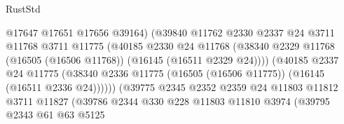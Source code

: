 \begin{lexlean}{RustStd}
\begin{coremodule}
                                          @17647
                                          @17651
                                          @17656
                                          @39164)
                                        (@39840
                                          @11762
                                          @2330
                                          @2337
                                          @24
                                          @3711
                                          @11768
                                          @3711
                                          @11775
                                          (@40185
                                            @2330
                                            @24
                                            @11768
                                            (@38340
                                              @2329
                                              @11768
                                              (@16505 (@16506 @11768))
                                              (@16145 (@16511 @2329 @24))))
                                          (@40185
                                            @2337
                                            @24
                                            @11775
                                            (@38340
                                              @2336
                                              @11775
                                              (@16505 (@16506 @11775))
                                              (@16145 (@16511 @2336 @24))))))
                                      (@39775
                                        @2345
                                        @2352
                                        @2359
                                        @24
                                        @11803
                                        @11812
                                        @3711
                                        @11827
                                        (@39786
                                          @2344
                                          @330
                                          @228
                                          @11803
                                          @11810
                                          @3974
                                          (@39795
                                            @2343
                                            @61
                                            @63
                                            @5125

\end{coremodule}
\end{lexlean}
